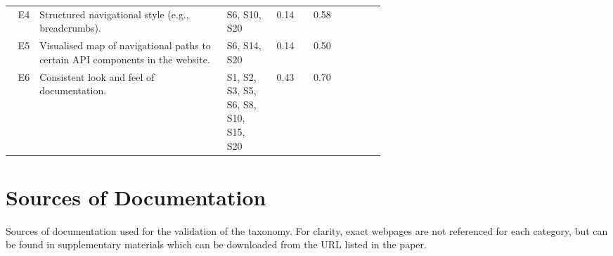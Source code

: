 {{\begin{landscape}
\begin{longtable}{rp{0.5\linewidth}|p{0.125\linewidth}|cc|ccc}
  E4&
  Structured navigational style (e.g., breadcrumbs).
  &
  \scriptsize S6, S10, S20 &
  \cellcolor[HTML]{eb9071}0.14&\cellcolor[HTML]{dad06e}0.58&\circlepresent{}&\circlepresent{}&\circlepresent{}\\

  E5&
  Visualised map of navigational paths to certain API components in the website.
  &
  \scriptsize S6, S14, S20 &
  \cellcolor[HTML]{eb9071}0.14&\cellcolor[HTML]{f5d568}0.50&\circlenotpresent{}&\circlenotpresent{}&\circlenotpresent{}\\

  {E6}&
  {Consistent look and feel of documentation.}
  &
  \scriptsize {S1, S2, S3, S5, S6, S8, S10, S15, S20} &
  \cellcolor[HTML]{fccd68}0.43&\cellcolor[HTML]{adc977}0.70&\circlepresent{}&\circlepresent{}&\circlepresent{}\\
\end{longtable}
\end{landscape}}
}

\clearpage
\section{Sources of Documentation}\label{tse2020:tab:docsources}

Sources of documentation used for the validation of the taxonomy. For clarity, exact webpages are not referenced for each category, but can be found in supplementary materials which can be downloaded from the URL listed in the paper.
\bigskip

